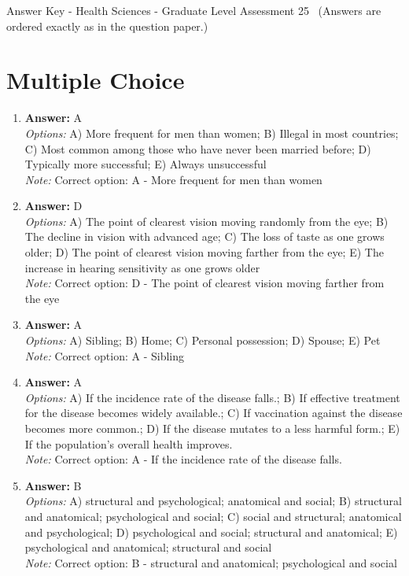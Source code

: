 \documentclass[12pt]{article}
\begin{document}
\begin{center}
Answer Key - Health Sciences - Graduate Level Assessment 25 \
\small (Answers are ordered exactly as in the question paper.)
\end{center}

\section*{Multiple Choice}
\begin{enumerate}[label=\arabic*.]
\item \textbf{Answer:} A
\\ \textit{Options:} A) More frequent for men than women; B) Illegal in most countries; C) Most common among those who have never been married before; D) Typically more successful; E) Always unsuccessful
\\ \textit{Note:} Correct option: A - More frequent for men than women
\item \textbf{Answer:} D
\\ \textit{Options:} A) The point of clearest vision moving randomly from the eye; B) The decline in vision with advanced age; C) The loss of taste as one grows older; D) The point of clearest vision moving farther from the eye; E) The increase in hearing sensitivity as one grows older
\\ \textit{Note:} Correct option: D - The point of clearest vision moving farther from the eye
\item \textbf{Answer:} A
\\ \textit{Options:} A) Sibling; B) Home; C) Personal possession; D) Spouse; E) Pet
\\ \textit{Note:} Correct option: A - Sibling
\item \textbf{Answer:} A
\\ \textit{Options:} A) If the incidence rate of the disease falls.; B) If effective treatment for the disease becomes widely available.; C) If vaccination against the disease becomes more common.; D) If the disease mutates to a less harmful form.; E) If the population's overall health improves.
\\ \textit{Note:} Correct option: A - If the incidence rate of the disease falls.
\item \textbf{Answer:} B
\\ \textit{Options:} A) structural and psychological; anatomical and social; B) structural and anatomical; psychological and social; C) social and structural; anatomical and psychological; D) psychological and social; structural and anatomical; E) psychological and anatomical; structural and social
\\ \textit{Note:} Correct option: B - structural and anatomical; psychological and social
\end{enumerate}
\end{document}
